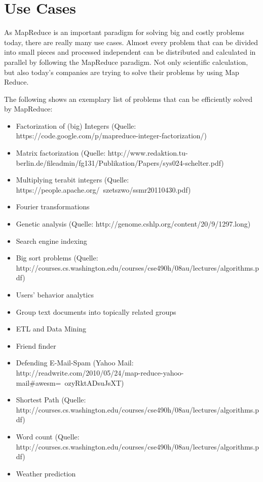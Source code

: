 \chapter{Use Cases}
As MapReduce is an important paradigm for solving big and costly problems today, there are really
many use cases. Almost every problem that can be divided into small pieces and processed independent
can be distributed and calculated in parallel by following the MapReduce paradigm. Not only
scientific calculation, but also today’s companies are trying to solve their problems by using Map
Reduce.

The following shows an exemplary list of problems that can be efficiently solved by MapReduce:
\begin{singlespacing}
	\begin{itemize}
	  \item Factorization of (big) Integers (Quelle: https://code.google.com/p/mapreduce-integer-factorization/) 
	  \item Matrix factorization (Quelle: http://www.redaktion.tu-berlin.de/fileadmin/fg131/Publikation/Papers/sys024-schelter.pdf) 
	  \item Multiplying terabit integers (Quelle: https://people.apache.org/~szetszwo/ssmr20110430.pdf)
	  \item Fourier transformations
	  \item Genetic analysis (Quelle: http://genome.cshlp.org/content/20/9/1297.long) 
	  \item Search engine indexing
	  \item Big sort problems (Quelle: http://courses.cs.washington.edu/courses/cse490h/08au/lectures/algorithms.pdf) 
	  \item Users' behavior analytics
	  \item Group text documents into topically related groups
	  \item ETL and Data Mining
	  \item Friend finder
	  \item Defending E-Mail-Spam (Yahoo Mail: http://readwrite.com/2010/05/24/map-reduce-yahoo-mail#awesm=~ozyRktADsuJsXT) 
	  \item Shortest Path (Quelle: http://courses.cs.washington.edu/courses/cse490h/08au/lectures/algorithms.pdf)  
	  \item Word count (Quelle: http://courses.cs.washington.edu/courses/cse490h/08au/lectures/algorithms.pdf) 
	  \item Weather prediction
	\end{itemize}
\end{singlespacing}

